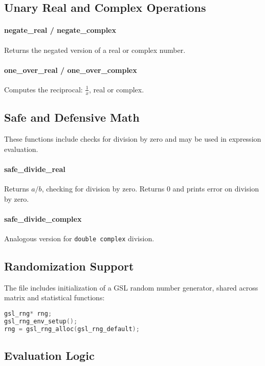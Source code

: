 \documentclass[12pt]{article}
\begin{document}
\subsection{Unary Real and Complex Operations}

\paragraph{negate\_real / negate\_complex}
Returns the negated version of a real or complex number.

\paragraph{one\_over\_real / one\_over\_complex}
Computes the reciprocal: \( \frac{1}{x} \), real or complex.

\subsection{Safe and Defensive Math}

These functions include checks for division by zero and may be used in expression evaluation.

\paragraph{safe\_divide\_real}
Returns \( a / b \), checking for division by zero.  
Returns 0 and prints error on division by zero.

\paragraph{safe\_divide\_complex}
Analogous version for \texttt{double complex} division.

\subsection{Randomization Support}

The file includes initialization of a GSL random number generator, shared across matrix and statistical functions:

\begin{lstlisting}[language=C]
gsl_rng* rng;
gsl_rng_env_setup();
rng = gsl_rng_alloc(gsl_rng_default);
\end{lstlisting}

\subsection{Evaluation Logic}
\end{document}
